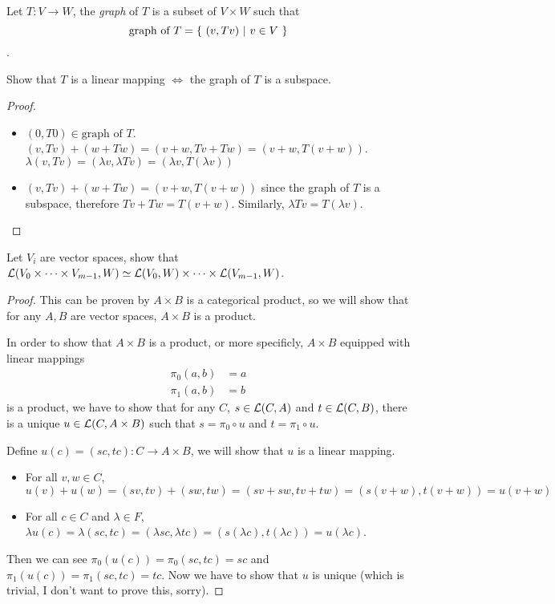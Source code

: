 \documentclass[../main.tex]{subfiles}
\begin{document}
\setcounter{section}{3}
\setcounter{exercise}{0}

\begin{exercise}
  Let $T : V \rightarrow W$, the \textit{graph} of $T$ is a subset of $V \times W$
  such that
  \[
  \text{graph of } T = \{ \ (v, Tv) \ | \ v \in V \ \}
  \].

  Show that $T$ is a linear mapping $\iff$ the graph of $T$ is a subspace.
\end{exercise}
\begin{proof}
  ~
  \begin{itemize}
    \item $(0, T0) \in \text{graph of } T$. $(v, Tv) + (w + Tw) = (v + w, Tv + Tw) = (v + w, T (v + w))$.
          $\lambda (v, Tv) = (\lambda v, \lambda Tv) = (\lambda v, T(\lambda v))$
    \item $(v, Tv) + (w + Tw) = (v + w, T (v + w))$ since the graph of $T$ is a subspace, therefore
          $Tv + Tw = T (v + w)$. Similarly, $\lambda Tv = T (\lambda v)$.
  \end{itemize}
\end{proof}

\setcounter{exercise}{2}
\begin{exercise}
  Let $V_i$ are vector spaces, show that $\mathcal{L}(V_0 \times \cdots \times V_{m - 1}, W) \simeq \mathcal{L}(V_0, W) \times \cdots \times \mathcal{L}(V_{m - 1}, W)$.
\end{exercise}
\begin{proof}
  This can be proven by $A \times B$ is a categorical product, so we will show that
  for any $A, B$ are vector spaces, $A \times B$ is a product.

  In order to show that $A \times B$ is a product, or more specificly,
  $A \times B$ equipped with linear mappings
  \begin{align*}
    \pi_0(a, b) & = a \\
    \pi_1(a, b) & = b
  \end{align*}
  is a product, we have to show that for any $C$, $s \in \mathcal{L}(C, A)$ and $t \in \mathcal{L}(C, B)$,
  there is a unique $u \in \mathcal{L}(C, A \times B)$ such that $s = \pi_0 \circ u$ and $t = \pi_1 \circ u$.
  
  Define $u(c) = (sc, tc) : C \rightarrow A \times B$, we will show that $u$ is a linear
  mapping.
  \begin{itemize}
    \item For all $v, w \in C$, $u(v) + u(w) = (sv, tv) + (sw, tw) = (sv + sw, tv + tw) = (s(v + w), t(v + w)) = u(v + w)$
    \item For all $c \in C$ and $\lambda \in F$, $\lambda u(c) = \lambda (sc, tc) = (\lambda sc, \lambda tc) = (s (\lambda c), t (\lambda c)) = u(\lambda c)$.
  \end{itemize}

  Then we can see $\pi_0 (u(c)) = \pi_0 (sc, tc) = sc$ and $\pi_1(u(c)) = \pi_1 (sc, tc) = tc$.
  Now we have to show that $u$ is unique (which is trivial, I don't want to prove this, sorry).
\end{proof}
\end{document}
